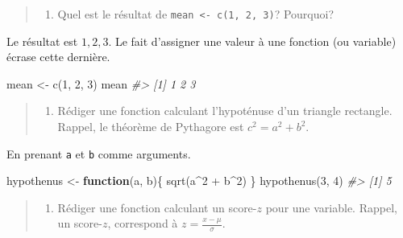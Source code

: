 \documentclass[
]{book}
\newenvironment{Shaded}{}{}
\newcommand{\CommentTok}[1]{\textit{#1}}
\newcommand{\ControlFlowTok}[1]{\textbf{#1}}
\newcommand{\DecValTok}[1]{#1}
\newcommand{\FunctionTok}[1]{#1}
\newcommand{\NormalTok}[1]{#1}
\newcommand{\OtherTok}[1]{#1}
\newcommand{\SpecialCharTok}[1]{#1}
\providecommand{\tightlist}{%
  \setlength{\itemsep}{0pt}\setlength{\parskip}{0pt}}
\begin{document}
\begin{quote}
\begin{enumerate}
\def\labelenumi{\arabic{enumi}.}
\tightlist
\item
  Quel est le résultat de \texttt{mean\ \textless{}-\ c(1,\ 2,\ 3)}? Pourquoi?
\end{enumerate}
\end{quote}

Le résultat est \(1, 2, 3\). Le fait d'assigner une valeur à une fonction (ou variable) écrase cette dernière.

\begin{Shaded}
\begin{Highlighting}[]
\NormalTok{mean }\OtherTok{\textless{}{-}} \FunctionTok{c}\NormalTok{(}\DecValTok{1}\NormalTok{, }\DecValTok{2}\NormalTok{, }\DecValTok{3}\NormalTok{)}
\NormalTok{mean}
\CommentTok{\#\textgreater{} [1] 1 2 3}
\end{Highlighting}
\end{Shaded}

\begin{quote}
\begin{enumerate}
\def\labelenumi{\arabic{enumi}.}
\setcounter{enumi}{1}
\tightlist
\item
  Rédiger une fonction calculant l'hypoténuse d'un triangle rectangle. Rappel, le théorème de Pythagore est \(c^2=a^2+b^2\).
\end{enumerate}
\end{quote}

En prenant \texttt{a} et \texttt{b} comme arguments.

\begin{Shaded}
\begin{Highlighting}[]
\NormalTok{hypothenus }\OtherTok{\textless{}{-}} \ControlFlowTok{function}\NormalTok{(a, b)\{}
  \FunctionTok{sqrt}\NormalTok{(a}\SpecialCharTok{\^{}}\DecValTok{2} \SpecialCharTok{+}\NormalTok{ b}\SpecialCharTok{\^{}}\DecValTok{2}\NormalTok{)}
\NormalTok{\}}
\FunctionTok{hypothenus}\NormalTok{(}\DecValTok{3}\NormalTok{, }\DecValTok{4}\NormalTok{)}
\CommentTok{\#\textgreater{} [1] 5}
\end{Highlighting}
\end{Shaded}

\begin{quote}
\begin{enumerate}
\def\labelenumi{\arabic{enumi}.}
\setcounter{enumi}{2}
\tightlist
\item
  Rédiger une fonction calculant un score-\(z\) pour une variable. Rappel, un score-\(z\), correspond à \(z=\frac{x-\mu}{\sigma}\).
\end{enumerate}
\end{quote}
\end{document}
